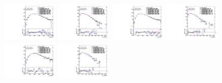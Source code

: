 \begin{figure}[htbp!]
\begin{center}
\includegraphics[width=0.24\textwidth,angle=-90]{figures/boosted/AppendixReweight/Compare/Data_ThreeTag_Sideband_directcompare_leadHCand_trk0_Pt_1.pdf}
\includegraphics[width=0.24\textwidth,angle=-90]{figures/boosted/AppendixReweight/Compare/Data_ThreeTag_Sideband_directcompare_leadHCand_trk1_Pt_1.pdf}
\includegraphics[width=0.24\textwidth,angle=-90]{figures/boosted/AppendixReweight/Compare/Data_ThreeTag_Sideband_directcompare_sublHCand_trk0_Pt_1.pdf}
\includegraphics[width=0.24\textwidth,angle=-90]{figures/boosted/AppendixReweight/Compare/Data_ThreeTag_Sideband_directcompare_sublHCand_trk1_Pt_1.pdf}\\
\includegraphics[width=0.24\textwidth,angle=-90]{figures/boosted/AppendixReweight/Compare/Data_ThreeTag_Control_directcompare_leadHCand_trk0_Pt_1.pdf}
\includegraphics[width=0.24\textwidth,angle=-90]{figures/boosted/AppendixReweight/Compare/Data_ThreeTag_Control_directcompare_leadHCand_trk1_Pt_1.pdf}

\end{center}
\end{figure}
